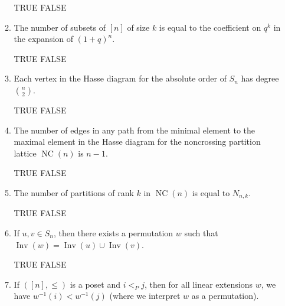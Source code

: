 \documentclass[11pt]{article}
\theoremstyle{definition}
\newcommand{\ds}{\displaystyle}
\DeclareMathOperator{\Inv}{Inv}
\DeclareMathOperator{\Abs}{Abs}
\DeclareMathOperator{\NC}{NC}
\begin{document}
\begin{enumerate}
\begin{enumerate}[label=\text{(\alph*)}]
TRUE \qquad FALSE

\item The number of subsets of $[n]$ of size $k$ is equal to the coefficient on $q^k$ in the expansion of $(1+q)^n$. %

\smallskip

TRUE \qquad FALSE

%
%

\item Each vertex in the Hasse diagram for the absolute order of $S_n$ has degree $\displaystyle\binom{n}{2}$.

\smallskip

TRUE \qquad FALSE

\item The number of edges in any path from the minimal element to the maximal element in the Hasse diagram for the noncrossing partition lattice $\NC(n)$ is $n-1$.

\smallskip

TRUE \qquad FALSE

\item The number of partitions of rank $k$ in $\NC(n)$ is equal to $N_{n,k}$.

\smallskip

TRUE \qquad FALSE

%
%

%
%

\item If $u,v\in S_n$, then there exists a permutation $w$ such that $\Inv(w)=\Inv(u)\cup \Inv(v)$.

\smallskip

TRUE \qquad FALSE

\item If $([n],\leq)$ is a poset and $i<_P j$, then for all linear extensions $w$, we have $w^{-1} (i)<w^{-1}(j)$ (where we interpret $w$ as a permutation).


\end{enumerate}
\end{enumerate}
\end{document}
